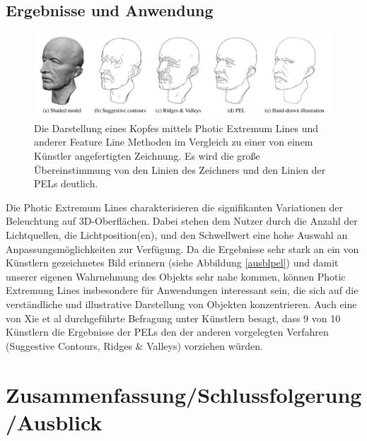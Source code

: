 \documentclass{paperStyle}
\begin{document}
\subsection{Ergebnisse und Anwendung}
\begin{figure}
	\centering
		\includegraphics[width=0.9\linewidth]{anwpel.png}
	\caption{Die Darstellung eines Kopfes mittels Photic Extremum Lines und anderer Feature Line Methoden im Vergleich zu einer von einem Künstler angefertigten Zeichnung. Es wird die große Übereinstimmung von den Linien des Zeichners und den Linien der PELs deutlich. \cite{Xie2007}}
	\label{anwpel}
\end{figure}
Die Photic Extremum Lines charakterisieren die signifikanten Variationen der Beleuchtung auf 3D-Oberflächen. Dabei stehen dem Nutzer durch die Anzahl der Lichtquellen, die Lichtposition(en), und den Schwellwert eine hohe Auswahl an Anpassungsmöglichkeiten zur Verfügung. Da die Ergebnisse sehr stark an ein von Künstlern gezeichnetes Bild erinnern (siehe Abbildung \ref{ausblpel}) und damit unserer eigenen Wahrnehmung des Objekts sehr nahe kommen, können Photic Extremung Lines insbesondere für Anwendungen interessant sein, die sich auf die verständliche und illustrative Darstellung von Objekten konzentrieren. Auch eine von Xie et al \cite{Xie2007} durchgeführte Befragung unter Künstlern besagt, dass 9 von 10 Künstlern die Ergebnisse der PELs den der anderen vorgelegten Verfahren (Suggestive Contours, Ridges \& Valleys) vorziehen würden. 
\section{Zusammenfassung/Schlussfolgerung/Ausblick}
\end{document}
